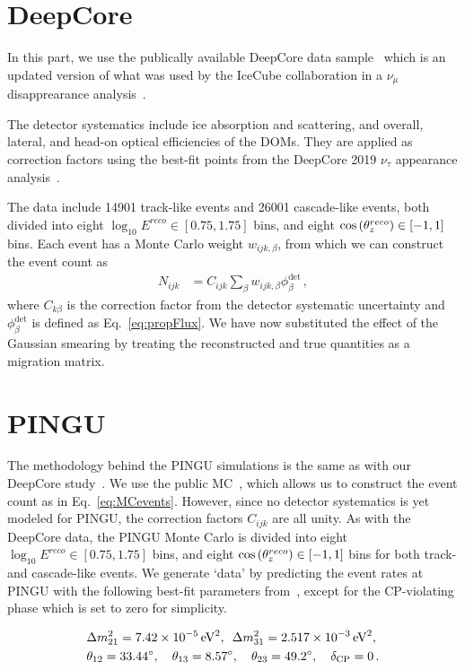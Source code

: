 % 
% 
\section{DeepCore}\label{ch:DCmethod}
In this part, we use the publically available DeepCore data sample~\cite{DC2019data} which is an updated version of what was used by the 
IceCube collaboration in a $\nu_\mu$ disapprearance analysis~\cite{DC2018mudisappearance}.

The detector systematics include ice absorption and scattering, and overall, lateral, and head-on optical efficiencies of the DOMs. 
They are applied as correction factors using the best-fit points from the DeepCore 2019 $\nu_\tau$ appearance 
analysis~\cite{DC2019tauappearance}.

The data include 14901 track-like events and 26001 cascade-like events, both divided into eight 
$ \log_{10}E^{reco} \in [0.75,1.75]$ bins, and eight $\cos{(\theta_z^{reco})} \in [-1,1]$ bins. Each event has a Monte Carlo weight $w_{ijk,\beta}$,
from which we can construct the event count as
\begin{align}\label{eq:MCevents}
    N_{ijk} &= C_{ijk}\sum_{\beta}w_{ijk,\beta} \phi_\beta^\text{det}\,,
\end{align}
where $C_{k\beta}$ is the correction factor from the detector systematic uncertainty and $\phi_\beta^\text{det}$ is defined as Eq.~\ref{eq:propFlux}. We have now substituted the effect of the Gaussian smearing 
by treating the reconstructed and true quantities as a migration matrix. 


\section{PINGU}
The methodology behind the PINGU simulations is the same as with our DeepCore study~. We use the public MC~\cite{PINGUdata}, which allows us to construct the event count as in Eq.~\ref{eq:MCevents}.
However, since no detector systematics is yet modeled for PINGU, the correction factors $C_{ijk}$ are all unity.
As with the DeepCore data, the PINGU Monte Carlo is divided into eight 
$\log_{10}E^{reco} \in [0.75,1.75]$ bins, and eight $\cos{(\theta_z^{reco})} \in [-1,1]$ bins for both track- and cascade-like events. 
We generate `data' by predicting the event rates at PINGU with the following best-fit parameters from~\cite{nufit}, except for the CP-violating phase which is set to zero for simplicity.

\begin{align}\label{eq:PINGUparams}
    &\Delta m^2_{21} =  \SI{7.42e-5}{\electronvolt^2},\hspace{0.5em} \dm[31] =  \SI{2.517e-3}{\electronvolt^2}, \nonumber \\
    &\theta_{12} = \SI{33.44}{\degree},\hspace{1em} \theta_{13} = \SI{8.57}{\degree},\hspace{1em} \theta_{23} = \SI{49.2}{\degree}, \hspace{1em} \delta_\text{CP} = 0\,.
\end{align}
